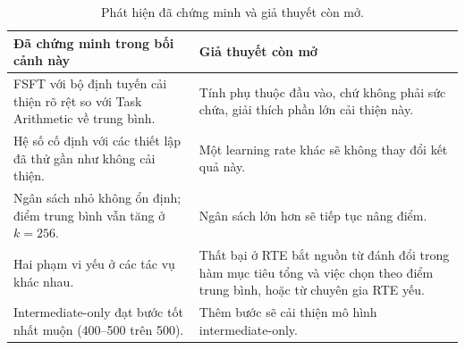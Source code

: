 \begin{table}[htbp]
  \centering\tablestyle
  \caption{Phát hiện đã chứng minh và giả thuyết còn mở.}
  \label{tab:findings}
  \begin{tabularx}{\linewidth}{*{2}{>{\raggedright\arraybackslash}X}}
    \toprule
    Đã chứng minh trong bối cảnh này & Giả thuyết còn mở\\
    \midrule
    FSFT với bộ định tuyến cải thiện rõ rệt so với Task Arithmetic về trung bình. & Tính phụ thuộc đầu vào, chứ không phải sức chứa, giải thích phần lớn cải thiện này.\\
    Hệ số cố định với các thiết lập đã thử gần như không cải thiện. & Một learning rate khác sẽ không thay đổi kết quả này.\\
    Ngân sách nhỏ không ổn định; điểm trung bình vẫn tăng ở $k=256$. & Ngân sách lớn hơn sẽ tiếp tục nâng điểm.\\
    Hai phạm vi yếu ở các tác vụ khác nhau. & Thất bại ở RTE bắt nguồn từ đánh đổi trong hàm mục tiêu tổng và việc chọn theo điểm trung bình, hoặc từ chuyên gia RTE yếu.\\
    Intermediate-only đạt bước tốt nhất muộn (400--500 trên 500). & Thêm bước sẽ cải thiện mô hình intermediate-only.\\
    \bottomrule
  \end{tabularx}
\end{table}
